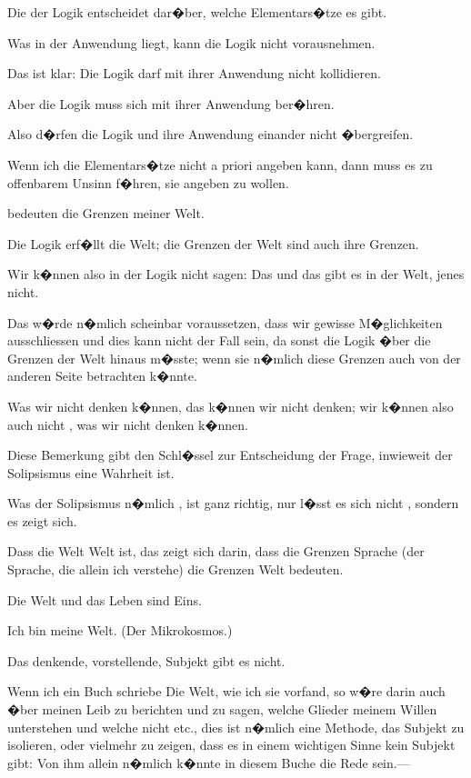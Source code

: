 {Die  der Logik entscheidet
dar�ber, welche Elementars�tze es gibt.

Was in der Anwendung liegt, kann die Logik
nicht vorausnehmen.

Das ist klar: Die Logik darf mit ihrer Anwendung
nicht kollidieren.

Aber die Logik muss sich mit ihrer Anwendung
ber�hren.

Also d�rfen die Logik und ihre Anwendung
einander nicht �bergreifen.}


{Wenn ich die Elementars�tze nicht a priori
angeben kann, dann muss es zu offenbarem Unsinn
f�hren, sie angeben zu wollen.}


{ bedeuten
die Grenzen meiner Welt.}


{Die Logik erf�llt die Welt; die Grenzen der
Welt sind auch ihre Grenzen.

Wir k�nnen also in der Logik nicht sagen: Das
und das gibt es in der Welt, jenes nicht.

Das w�rde n�mlich scheinbar voraussetzen, dass
\enlargethispage{9pt} %
wir gewisse M�glichkeiten ausschliessen und dies
kann nicht der Fall sein, da sonst die Logik
�ber die Grenzen der Welt hinaus m�sste; wenn
sie n�mlich diese Grenzen auch von der anderen
Seite betrachten k�nnte.

Was wir nicht denken k�nnen, das k�nnen wir
nicht denken; wir k�nnen also auch nicht ,
was wir nicht denken k�nnen.}


{Diese Bemerkung gibt den Schl�ssel zur
Entscheidung der Frage, inwieweit der Solipsismus
eine Wahrheit ist.

Was der Solipsismus n�mlich , ist ganz
richtig, nur l�sst es sich nicht , sondern es
zeigt sich.

Dass die Welt  Welt ist, das zeigt sich darin,
dass die Grenzen  Sprache (der Sprache, die allein
ich verstehe) die Grenzen  Welt bedeuten.}


{Die Welt und das Leben sind Eins.}


{Ich bin meine Welt. (Der Mikrokosmos.)}


{Das denkende, vorstellende, Subjekt gibt es nicht.

Wenn ich ein Buch schriebe \glqq{}Die Welt, wie ich
sie vorfand\grqq{}, so w�re darin auch �ber meinen Leib
zu berichten und zu sagen, welche Glieder meinem
Willen unterstehen und welche nicht etc., dies ist
n�mlich eine Methode, das Subjekt zu isolieren,
oder vielmehr zu zeigen, dass es in einem wichtigen
Sinne kein Subjekt gibt: Von ihm allein n�mlich
k�nnte in diesem Buche  die Rede sein.---}


